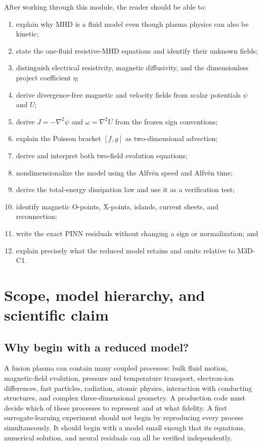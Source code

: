 \documentclass[11pt]{article}
\begin{document}
After working through this module, the reader should be able to:
\begin{enumerate}[label=\arabic*.]
  \item explain why MHD is a fluid model even though plasma physics can also be kinetic;
  \item state the one-fluid resistive-MHD equations and identify their unknown fields;
  \item distinguish electrical resistivity, magnetic diffusivity, and the dimensionless project coefficient $\eta$;
  \item derive divergence-free magnetic and velocity fields from scalar potentials $\psi$ and $U$;
  \item derive $J=-\nabla^2\psi$ and $\omega=\nabla^2U$ from the frozen sign conventions;
  \item explain the Poisson bracket $[f,g]$ as two-dimensional advection;
  \item derive and interpret both two-field evolution equations;
  \item nondimensionalize the model using the Alfv\'en speed and Alfv\'en time;
  \item derive the total-energy dissipation law and use it as a verification test;
  \item identify magnetic O-points, X-points, islands, current sheets, and reconnection;
  \item write the exact PINN residuals without changing a sign or normalization; and
  \item explain precisely what the reduced model retains and omits relative to M3D-C1.
\end{enumerate}

\ProjectTOC
\clearpage
{}

\section{Scope, model hierarchy, and scientific claim}
\label{sec:scope}

\subsection{Why begin with a reduced model?}

A fusion plasma can contain many coupled processes: bulk fluid motion, magnetic-field evolution, pressure and temperature transport, electron-ion differences, fast particles, radiation, atomic physics, interaction with conducting structures, and complex three-dimensional geometry. A production code must decide which of these processes to represent and at what fidelity. A first surrogate-learning experiment should not begin by reproducing every process simultaneously. It should begin with a model small enough that its equations, numerical solution, and neural residuals can all be verified independently.
\end{document}

